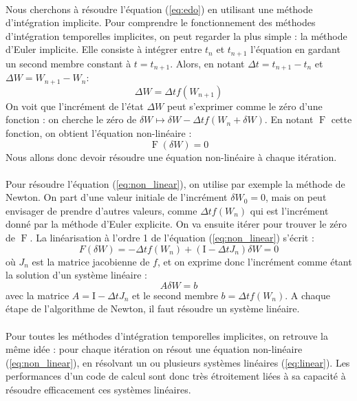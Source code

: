 		\paragraph{} Nous cherchons à résoudre l'équation (\ref{eq:edo}) en utilisant une méthode d'intégration implicite.
		Pour comprendre le fonctionnement des méthodes d'intégration temporelles implicites, on peut regarder la plus simple : la méthode d'Euler implicite.
		Elle consiste à intégrer entre $t_n$ et $t_{n+1}$ l'équation en gardant un second membre constant à $t = t_{n+1}$.
		Alors, en notant $\Delta t = t_{n+1} - t_n$ et $\Delta W = W_{n+1} - W_n$:
		$$\Delta W = \Delta t f\left(W_{n+1}\right)$$
		On voit que l'incrément de l'état $\Delta W$ peut s'exprimer comme le zéro d'une fonction : on cherche le zéro de $\delta W \mapsto \delta W - \Delta t f\left(W_n + \delta W\right)$.
		En notant $\operatorname{F}$ cette fonction, on obtient l'équation non-linéaire :
		\begin{equation}\label{eq:non_linear}
			\operatorname{F}\left(\delta W\right) = 0
		\end{equation}
		Nous allons donc devoir résoudre une équation non-linéaire à chaque itération.

		\paragraph{} Pour résoudre l'équation (\ref{eq:non_linear}), on utilise par exemple la méthode de Newton.
		On part d'une valeur initiale de l'incrément $\delta W_0 = 0$, mais on peut envisager de prendre d'autres valeurs, comme $\Delta t f\left(W_n\right)$ qui est l'incrément donné par la méthode d'Euler explicite.
		On va ensuite itérer pour trouver le zéro de $\operatorname{F}$.
		La linéarisation à l'ordre 1 de l'équation (\ref{eq:non_linear}) s'écrit :
		$$F(\delta W) = -\Delta t f\left(W_n\right) + \left(\mathrm{I} - \Delta t J_n\right)\delta W = 0$$
		où $J_n$ est la matrice jacobienne de $f$, et on exprime donc l'incrément comme étant la solution d'un système linéaire :
		\begin{equation}\label{eq:linear}A\delta W = b\end{equation}
		avec la matrice $A = \mathrm{I} - \Delta t J_n$ et le second membre $b = \Delta t f\left(W_n\right)$.
		A chaque étape de l'algorithme de Newton, il faut résoudre un système linéaire.

		\paragraph{} Pour toutes les méthodes d'intégration temporelles implicites, on retrouve la même idée : pour chaque itération on résout une équation non-linéaire (\ref{eq:non_linear}), en résolvant un ou plusieurs systèmes linéaires (\ref{eq:linear}).
		Les performances d'un code de calcul sont donc très étroitement liées à sa capacité à résoudre efficacement ces systèmes linéaires.



